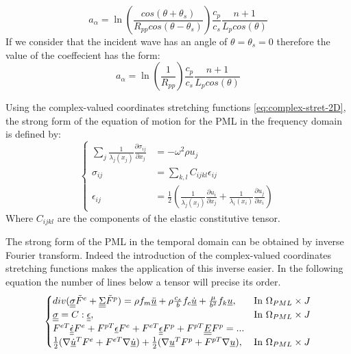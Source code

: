 \begin{equation}
a_\alpha = \ln\left(\frac{cos(\theta+\theta_s)}{R_{pp}cos(\theta-\theta_s)} \right) \frac{c_p}{c_s} \frac{n+1}{L_p cos(\theta)}
\end{equation} 
If we consider that the incident wave has an angle of $\theta = \theta_s = 0$ therefore the value of the coeffecient has the form:
\begin{equation}
a_\alpha = \ln\left(\frac{1}{R_{pp}} \right) \frac{c_p}{c_s} \frac{n+1}{L_p cos(\theta)}
\end{equation}
\par Using the complex-valued coordinates stretching functions \ref{eq:complex-stret-2D}, the strong form of the equation of motion for the PML in the frequency domain is defined by:
\begin{equation}
\begin{cases}
\sum_{j} \frac{1}{\lambda_j(x_j)} \frac{\partial \sigma_{ij}}{\partial x_j} & = - \omega^2 \rho u_j \\
\sigma_{ij} &= \sum_{k,l} C_{ijkl} \epsilon_{ij} \\
\epsilon_{ij} &= \frac{1}{2} \left(\frac{1}{\lambda_j(x_j)} \frac{\partial u_{i}}{\partial x_j} + \frac{1}{\lambda_i(x_i)} \frac{\partial u_{j}}{\partial x_i} \right)
\end{cases}
\label{eq:2D-PML-freq}
\end{equation} 
Where $C_{ijkl}$ are the components of the elastic constitutive tensor.
\par The strong form of the PML in the temporal domain can be obtained by inverse Fourier transform. Indeed the introduction of the complex-valued coordinates stretching functions makes the application of this inverse easier. In the following equation the number of lines below a tensor will precise its order. 
\begin{equation}
\begin{cases}
div(\underline{\underline{\sigma}}\tilde{F}^e + \underline{\underline{\Sigma}}\tilde{F}^p) = \rho f_m \underline{\ddot{u}} + \rho \frac{c_s}{b} f_c \underline{\dot{u}} + \frac{\mu}{b^2}f_k \underline{u}, & \text{In } \Omega_{PML} \times J\\
\underline{\underline{\sigma}} =  C : \underline{\underline{\epsilon}} , & \text{In } \Omega_{PML} \times J\\
F^{eT} \underline{\underline{\dot{\epsilon}}}F^e + F^{pT}\underline{\epsilon}F^e + F^{eT}\underline{\underline{\epsilon}}F^p + F^{pT} \underline{\underline{E}} F^p = ...\\
\frac{1}{2}(\nabla \underline{\dot{u}}^T F^e + F^{eT} \nabla \underline{\dot{u}})+\frac{1}{2}(\nabla \underline{u}^T F^p + F^{pT} \nabla \underline{u}), & \text{In } \Omega_{PML} \times J\\
\end{cases}
\label{eq:2D-PML-strong-timeD}
\end{equation}
